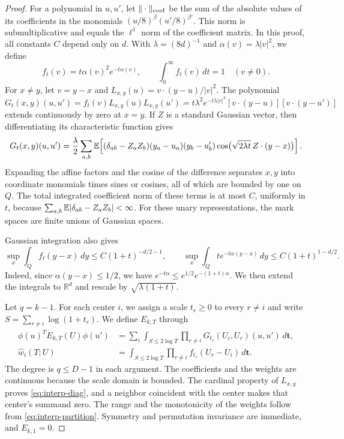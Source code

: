 \begin{proof}
For a polynomial in $u,u'$, let $\|\cdot\|_{\rm coef}$ be the sum
of the absolute values of its coefficients in the monomials
$(u/8)^\beta(u'/8)^{\beta'}$. This norm is submultiplicative and equals
the $\ell^1$ norm of the coefficient matrix. In this proof, all
constants $C$ depend only on $d$. With $\lambda=(8d)^{-1}$ and
$\alpha(v)=\lambda|v|^2$, we define
\begin{equation}\label{eq:interp-partition}
 f_t(v)=t\alpha(v)^2e^{-t\alpha(v)},\qquad
 \int_0^\infty f_t(v)\,dt=1\quad(v\ne0).
\end{equation}
For $x\ne y$, let $v=y-x$ and
$L_{x,y}(u)=v\cdot(y-u)/|v|^2$. The polynomial
\[
 G_t(x,y)(u,u')=f_t(v)L_{x,y}(u)L_{x,y}(u')
 =t\lambda^2e^{-t\lambda|v|^2}
 [v\cdot(y-u)][v\cdot(y-u')]
\]
extends continuously by zero at $x=y$. If $Z$ is a standard Gaussian
vector, then differentiating its characteristic function gives
\begin{equation}\label{eq:interp-unary}
 G_t(x,y)(u,u')=\frac{\lambda}{2}\sum_{a,b}
 \mathbb E\!\left[(\delta_{ab}-Z_aZ_b)(y_a-u_a)(y_b-u'_b)
 \cos\bigl(\sqrt{2\lambda t}\,Z\cdot(y-x)\bigr)\right].
\end{equation}
Expanding the affine factors and the cosine of the difference
separates $x,y$ into coordinate monomials times sines or cosines, all
of which are bounded by one on $Q$. The total integrated coefficient
norm of these terms is at most $C$, uniformly in $t$, because
$\sum_{a,b}\mathbb E|\delta_{ab}-Z_aZ_b|<\infty$.
For these unary representations, the mark spaces are finite unions of
Gaussian spaces.

Gaussian integration also gives
\begin{equation}\label{eq:interp-spatial}
 \sup_x\int_Q f_t(y-x)\,dy\le C(1+t)^{-d/2-1},\qquad
 \sup_x\int_Qte^{-t\alpha(y-x)}\,dy\le C(1+t)^{1-d/2}.
\end{equation}
Indeed, since $\alpha(y-x)\le1/2$, we have
$e^{-t\alpha}\le e^{1/2}e^{-(1+t)\alpha}$. We then extend the integrals
to $\mathbb R^d$ and rescale by $\sqrt{\lambda(1+t)}$.

Let $q=k-1$. For each center $i$, we assign a scale $t_r\ge0$ to
every $r\ne i$ and write $S=\sum_{r\ne i}\log(1+t_r)$. We define
$E_{k,T}$ through
\begin{equation}\label{eq:interp-kernel}
 \begin{aligned}
 \phi(u)^TE_{k,T}(U)\phi(u')
 &=\sum_i\int_{S\le2\log T}
       \prod_{r\ne i}G_{t_r}(U_i,U_r)(u,u')\,d\boldsymbol t,\\
 \widehat w_i(T;U)&=\int_{S\le2\log T}
       \prod_{r\ne i}f_{t_r}(U_r-U_i)\,d\boldsymbol t.
 \end{aligned}
\end{equation}
The degree is $q\le D-1$ in each argument. The coefficients and the
weights are continuous because the scale domain is bounded. The
cardinal property of $L_{x,y}$ proves \eqref{eq:interp-diag}, and a
neighbor coincident with the center makes that center's summand zero. The range and
the monotonicity of the weights follow from
\eqref{eq:interp-partition}. Symmetry and permutation invariance are
immediate, and $E_{k,1}=0$.


\end{proof}
